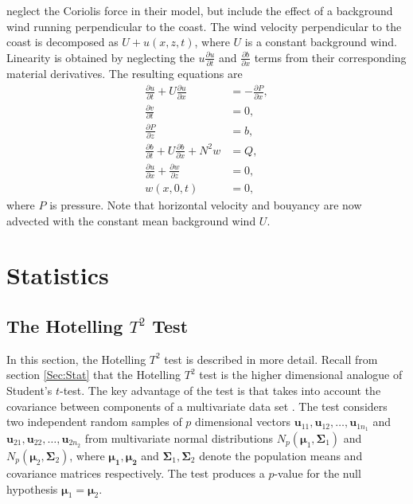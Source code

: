 \documentclass[12pt]{book}
\begin{document}
\citet{qian09} neglect the Coriolis force in their model, but include the effect of a background wind running perpendicular to the coast. The wind velocity perpendicular to the coast is decomposed as $U+u(x,z,t)$, where $U$ is a constant background wind. Linearity is obtained by neglecting the $u\frac{\partial u}{\partial t}$ and $\frac{\partial b}{\partial x}$ terms from their corresponding material derivatives. The resulting equations are  
\begin{align}
\frac{\partial u}{\partial t}+U\frac{\partial u}{\partial x}&=-\frac{\partial P}{\partial x}, \\
\frac{\partial v}{\partial t}&=0, \\
\frac{\partial P}{\partial z}&=b,\\
\frac{\partial b}{\partial t}+U\frac{\partial b}{\partial x}+N^2w&=Q, \\
\frac{\partial u}{\partial x}+\frac{\partial w}{\partial z}&=0, \\
w(x,0,t)&=0,
\end{align}
where $P$ is pressure. Note that horizontal velocity and bouyancy are now advected with the constant mean background wind $U$. 

\chapter{Statistics}
\section{The Hotelling $T^2$ Test}
\label{Ap:Stats}
In this section, the Hotelling $T^2$ test is described in more detail. Recall from section \ref{Sec:Stat} that the Hotelling $T^2$ test is the higher dimensional analogue of Student's $t$-test. The key advantage of the test is that takes into account the covariance between components of a multivariate data set \citep[p. 85]{rencher98}. The test considers two independent random samples of $p$ dimensional vectors $\boldsymbol{u}_{11}, \boldsymbol{u}_{12},\ldots, \boldsymbol{u}_{1n_1}$ and $\boldsymbol{u}_{21},\boldsymbol{u}_{22},\ldots,\boldsymbol{u}_{2n_2}$ from multivariate normal distributions $N_p(\boldsymbol{\mu}_1,\boldsymbol{\Sigma}_1)$ and $N_p(\boldsymbol{\mu}_2,\boldsymbol{\Sigma}_2)$, where $\boldsymbol{\mu_1},\boldsymbol{\mu_2}$ and $\boldsymbol{\Sigma}_1,\boldsymbol{\Sigma}_2$ denote the population means and covariance matrices respectively. The test produces a $p$-value for the null hypothesis $\boldsymbol{\mu}_1=\boldsymbol{\mu}_2$.
\end{document}
